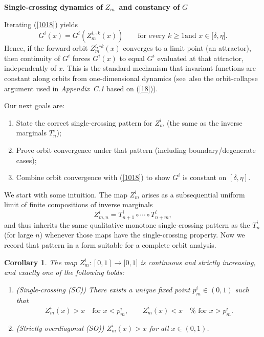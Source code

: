 \documentclass[onecolumn]{article}
\newtheorem{corollary}[theorem]{Corollary}
\begin{document}
\begin{flushleft}
\textbf{Single-crossing dynamics of }$Z_{m}$\textbf{\ and constancy of }$G$
\end{flushleft}

Iterating (\ref{1018}) yields 
\begin{equation}
G^{i}(x)=G^{i}(Z_{m}^{i,\circ k}(x))\qquad \text{for every }k\geq 1\text{
and }x\in \lbrack \delta ,\eta ].  \label{1019}
\end{equation}%
Hence, if the forward orbit $Z_{m}^{i,\circ k}(x)$ converges to a limit
point (an attractor), then continuity of $G^{i}$ forces $G^{i}(x)$ to equal $%
G^{i}$ evaluated at that attractor, independently of $x$. This is the
standard mechanism that invariant functions are constant along orbits from
one-dimensional dynamics (see\ also the orbit-collapse argument used in 
\textit{Appendix~C.1} based on (\ref{18})).

\medskip \noindent Our next goals are:

\begin{enumerate}
\item State the correct single-crossing pattern for $Z_{m}^{i}$ (the same as
the inverse marginals $T_{n}^{i}$);

\item Prove orbit convergence under that pattern (including
boundary/degenerate cases);

\item Combine orbit convergence with (\ref{1018}) to show $G^{i}$ is
constant on $[\delta ,\eta ]$.
\end{enumerate}

We start with some intuition. The map $Z_{m}^{i}$ arises as a subsequential
uniform limit of finite compositions of inverse marginals 
\begin{equation}
Z_{m,n}^{i}=T_{n+1}^{i}\circ \cdots \circ T_{n+m}^{i},  \label{1020}
\end{equation}%
and thus inherits the same qualitative monotone single-crossing pattern as
the $T_{n}^{i}$ (for large $n$) whenever those maps have the single-crossing
property. Now we record that pattern in a form suitable for a complete orbit
analysis.

\begin{corollary}
\label{Zm-singlecross} The map $Z_{m}^{i}:[0,1]\rightarrow \lbrack 0,1]$ is
continuous and strictly increasing, and exactly one of the following holds:

\begin{enumerate}
\item (\emph{Single-crossing (SC)}) There exists a unique fixed point $%
p_{m}^{i}\in (0,1)$ such that 
\begin{equation}
Z_{m}^{i}(x)>x\quad \text{for }x<p_{m}^{i},\qquad Z_{m}^{i}(x)<x\quad \text{%
for }x>p_{m}^{i}.  \label{1021}
\end{equation}

\item (\emph{Strictly overdiagonal (SO)}) $Z_{m}^{i}(x)>x$ for all $x\in
(0,1)$.
\end{enumerate}
\end{corollary}
\end{document}
